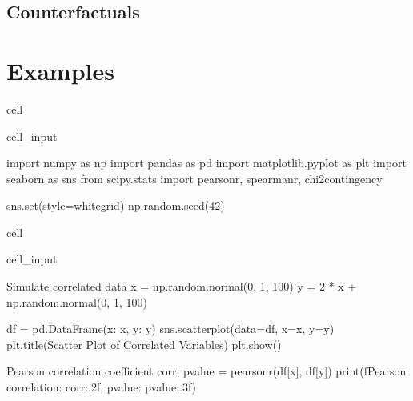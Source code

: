 \documentclass[letterpaper,10pt,english]{jupyterBook}
\begin{document}
\subsection{Counterfactuals}
\label{\detokenize{code/notebooks/correlation_vs_causation:counterfactuals}}

\section{Examples}
\label{\detokenize{code/notebooks/correlation_vs_causation:examples}}
\begin{sphinxuseclass}{cell}\begin{sphinxVerbatimInput}

\begin{sphinxuseclass}{cell_input}
\begin{sphinxVerbatim}[commandchars=\\\{\}]

import numpy as np
import pandas as pd
import matplotlib.pyplot as plt
import seaborn as sns
from scipy.stats import pearsonr, spearmanr, chi2\PYGZus{}contingency

sns.set(style=\PYGZsq{}whitegrid\PYGZsq{})
np.random.seed(42)
\end{sphinxVerbatim}

\end{sphinxuseclass}\end{sphinxVerbatimInput}

\end{sphinxuseclass}
\begin{sphinxuseclass}{cell}\begin{sphinxVerbatimInput}

\begin{sphinxuseclass}{cell_input}
\begin{sphinxVerbatim}[commandchars=\\\{\}]

\PYGZsh{} Simulate correlated data
x = np.random.normal(0, 1, 100)
y = 2 * x + np.random.normal(0, 1, 100)

df = pd.DataFrame(\PYGZob{}\PYGZsq{}x\PYGZsq{}: x, \PYGZsq{}y\PYGZsq{}: y\PYGZcb{})
sns.scatterplot(data=df, x=\PYGZsq{}x\PYGZsq{}, y=\PYGZsq{}y\PYGZsq{})
plt.title(\PYGZsq{}Scatter Plot of Correlated Variables\PYGZsq{})
plt.show()

\PYGZsh{} Pearson correlation coefficient
corr, p\PYGZus{}value = pearsonr(df[\PYGZsq{}x\PYGZsq{}], df[\PYGZsq{}y\PYGZsq{}])
print(f\PYGZdq{}Pearson correlation: \PYGZob{}corr:.2f\PYGZcb{}, p\PYGZhy{}value: \PYGZob{}p\PYGZus{}value:.3f\PYGZcb{}\PYGZdq{})
\end{sphinxVerbatim}

\end{sphinxuseclass}\end{sphinxVerbatimInput}

\end{sphinxuseclass}
\end{document}
